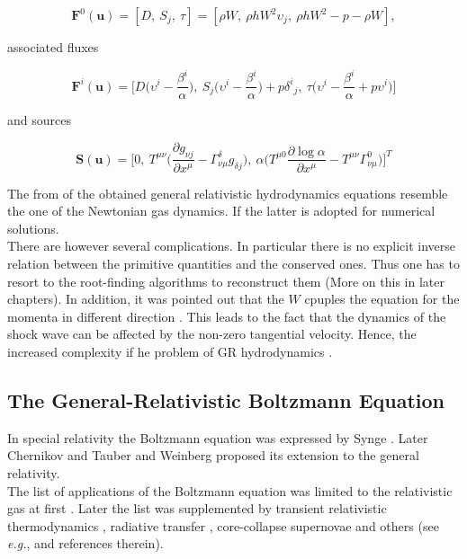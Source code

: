 \documentclass[11pt,a4paper,headinclude=true,DIV=14,BCOR=8mm,chapterprefix,listof=totoc,twoside,openright,abstracton]{scrbook}
\begin{document}
\begin{equation}
    \boldsymbol{F}^0(\boldsymbol{u}) = [D,\: S_j,\: \tau] = [\rho W,\: \rho h W^2 \upsilon_j,\: \rho h W^2 - p - \rho W],
\end{equation}

associated fluxes

\begin{equation}
    \boldsymbol{F}^i(\boldsymbol{u})=\Bigg[D\Big(\upsilon^{i}-\frac{\beta^i}{\alpha}\Big),\: S_{j}\Big(\upsilon^{i}-\frac{\beta^i}{\alpha}\Big)+p{\delta^i}_j ,\: \tau\Big(\upsilon^{i}-\frac{\beta^i}{\alpha}+p\upsilon^i\Big)\Bigg]
\end{equation}

and sources 

\begin{equation}
    \boldsymbol{S}(\boldsymbol{u}) = \Bigg[0,\: T^{\mu\nu}\Big(\frac{\partial g_{\nu j}}{\partial x^{\mu}} - \Gamma^{\delta}_{\nu\mu}g_{\delta j}\Big),\: \alpha\Big(T^{\mu 0}\frac{\partial\log\alpha}{\partial x^{\mu}}-T^{\mu\nu}\Gamma^{0}_{\nu\mu}\Big)\Bigg]^T
\end{equation}

The from of the obtained general relativistic hydrodynamics equations resemble the one of the Newtonian gas dynamics. If the latter is adopted for numerical solutions. \\
There are however several complications. In particular there is no explicit inverse relation between the primitive quantities and the conserved ones. Thus one has to resort to the root-finding algorithms to reconstruct them (More on this in later chapters). In addition, it was pointed out that the $W$ cpuples the equation for the momenta in different direction \cite{Pons:2000,Rezzolla:2002ra,Rezzolla:2002cc,Aloy:2006rd}. This leads to the fact that the dynamics of the shock wave can be affected by the non-zero tangential velocity. Hence, the increased complexity if he problem of GR hydrodynamics \cite{Mignone:2005ns,Zhang:2005qy}.


\subsection{The General-Relativistic Boltzmann Equation}

In special relativity the Boltzmann equation was expressed by Synge \cite{Synge:1957}. Later Chernikov \cite{Chernikov:1962} and Tauber and Weinberg \cite{Tauber:1961} proposed its extension to the general relativity. \\
The list of applications of the Boltzmann equation was limited to the relativistic gas at first \cite{Israel:1963}. Later the list was supplemented by transient relativistic thermodynamics \cite{Israel:1979wp}, radiative transfer \cite{Lindquist:1966}, core-collapse supernovae \cite{Bruenn:1985} and others (see \textit{e.g.}, \cite{Cercignani:2002} and references therein). \\
\end{document}
